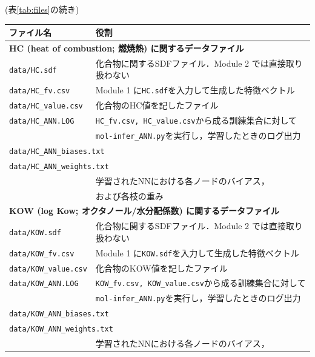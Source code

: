 \documentclass[11pt,dvipdfmx,twoside]{jarticle}
\newcommand{\tabref}[1]{表\ref{tab:#1}}
\begin{document}
\begin{table}[t!]
  \centering
  (\tabref{files}の続き)
  \begin{tabular}{lcll}
  \hline
  \bf ファイル名 &\ \ & \multicolumn{2}{l}{\bf 役割}\\
  \hline
  \multicolumn{4}{l}{\bf HC (heat of combustion; 燃焼熱) に関するデータファイル}\\
  \multicolumn{2}{l}{\tt data/HC.sdf} & \multicolumn{2}{l}{化合物に関するSDFファイル．Module 2 では直接取り扱わない}\\
  \multicolumn{2}{l}{\tt data/HC\_fv.csv} & \multicolumn{2}{l}{Module 1 に{\tt HC.sdf}を入力して生成した特徴ベクトル}\\
  \multicolumn{2}{l}{\tt data/HC\_value.csv} & \multicolumn{2}{l}{化合物のHC値を記したファイル}\\
  \multicolumn{2}{l}{\tt data/HC\_ANN.LOG} & \multicolumn{2}{l}{{\tt HC\_fv.csv, HC\_value.csv}から成る訓練集合に対して}\\
  &&\multicolumn{2}{l}{{\tt mol-infer\_ANN.py}を実行し，学習したときのログ出力}\\
  \multicolumn{4}{l}{\tt data/HC\_ANN\_biases.txt} \\
  \multicolumn{4}{l}{\tt data/HC\_ANN\_weights.txt} \\
  &&\multicolumn{2}{l}{学習されたNNにおける各ノードのバイアス，}\\
  &&\multicolumn{2}{l}{および各枝の重み}\\
  \hline
  \multicolumn{4}{l}{\bf KOW (log Kow; オクタノール/水分配係数) に関するデータファイル}\\
  \multicolumn{2}{l}{\tt data/KOW.sdf} & \multicolumn{2}{l}{化合物に関するSDFファイル．Module 2 では直接取り扱わない}\\
  \multicolumn{2}{l}{\tt data/KOW\_fv.csv} & \multicolumn{2}{l}{Module 1 に{\tt KOW.sdf}を入力して生成した特徴ベクトル}\\
  \multicolumn{2}{l}{\tt data/KOW\_value.csv} & \multicolumn{2}{l}{化合物のKOW値を記したファイル}\\
  \multicolumn{2}{l}{\tt data/KOW\_ANN.LOG} & \multicolumn{2}{l}{{\tt KOW\_fv.csv, KOW\_value.csv}から成る訓練集合に対して}\\
  &&\multicolumn{2}{l}{{\tt mol-infer\_ANN.py}を実行し，学習したときのログ出力}\\
  \multicolumn{4}{l}{\tt data/KOW\_ANN\_biases.txt} \\
  \multicolumn{4}{l}{\tt data/KOW\_ANN\_weights.txt} \\
  &&\multicolumn{2}{l}{学習されたNNにおける各ノードのバイアス，}\\

\end{tabular}
\end{table}
\end{document}
